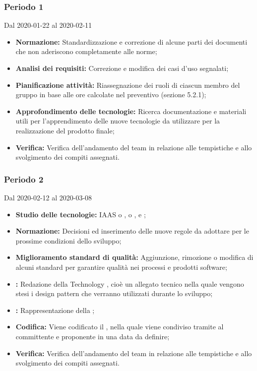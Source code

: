 \subsubsection{Periodo 1} 
Dal 2020-01-22 al 2020-02-11
\begin{itemize}
	\item \textbf{Normazione:} Standardizzazione e correzione di alcune parti dei documenti che non aderiscono completamente alle norme;
	\item \textbf{Analisi dei requisiti:} Correzione e modifica dei casi d'uso segnalati;
	\item \textbf{Pianificazione attività:} Riassegnazione dei ruoli di ciascun membro del gruppo in base alle ore calcolate nel preventivo (sezione 5.2.1);
	\item \textbf{Approfondimento delle tecnologie:} Ricerca documentazione e materiali utili per l'apprendimento delle nuove tecnologie da utilizzare per la realizzazione del prodotto finale;
	\item \textbf{Verifica:} Verifica dell'andamento del team in relazione alle tempistiche e allo svolgimento dei compiti assegnati.
\end{itemize}
\subsubsection{Periodo 2} 
Dal 2020-02-12 al 2020-03-08
\begin{itemize}
	\item \textbf{Studio delle tecnologie:} IAAS  o ,  o ,  e ;
	\item \textbf{Normazione:} Decisioni ed inserimento delle nuove regole da adottare per le prossime condizioni dello sviluppo;
	\item \textbf{Miglioramento standard di qualità:} Aggiunzione, rimozione o modifica di alcuni standard per garantire qualità nei processi e prodotti software;
	\item \textbf{:} Redazione della Technology , cioè un allegato tecnico nella quale vengono stesi i design pattern che verranno utilizzati durante lo sviluppo;
	\item \textbf{:} Rappresentazione della ;
	\item \textbf{Codifica:} Viene codificato il , nella quale viene condiviso tramite  al committente e proponente in una data da definire;
	\item \textbf{Verifica:} Verifica dell'andamento del team in relazione alle tempistiche e allo svolgimento dei compiti assegnati.
\end{itemize}
